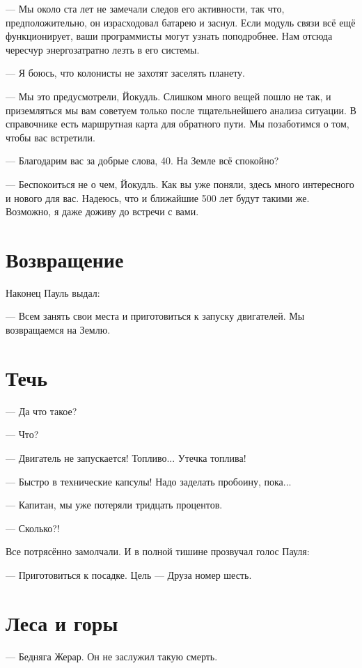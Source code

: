 \documentclass[a4paper,10pt,fleqn]{book}\usepackage{polyglossia}\setdefaultlanguage{english}\setotherlanguage{russian}\defaultfontfeatures{Ligatures=TeX,Mapping=tex-text}\usepackage{xcolor}\definecolor{lightgray}{HTML}{bbbbbb}\color{lightgray}\newcommand{\ml}[3]{\textcolor{black}{#3}}
\begin{document}
--- Мы около ста лет не замечали следов его активности, так что, предположительно, он израсходовал батарею и заснул.
Если модуль связи всё ещё функционирует, ваши программисты могут узнать поподробнее.
Нам отсюда чересчур энергозатратно лезть в его системы.

--- Я боюсь, что колонисты не захотят заселять планету.

--- Мы это предусмотрели, Йокудль.
Слишком много вещей пошло не так, и приземляться мы вам советуем только после тщательнейшего анализа ситуации.
В справочнике есть маршрутная карта для обратного пути.
Мы позаботимся о том, чтобы вас встретили.

--- Благодарим вас за добрые слова, 40.
На Земле всё спокойно?

--- Беспокоиться не о чем, Йокудль.
Как вы уже поняли, здесь много интересного и нового для вас.
Надеюсь, что и ближайшие 500 лет будут такими же.
Возможно, я даже доживу до встречи с вами.

\section{Возвращение}

Наконец Пауль выдал:

--- Всем занять свои места и приготовиться к запуску двигателей.
Мы возвращаемся на Землю.

\section{Течь}

--- Да что такое?

--- Что?

--- Двигатель не запускается!
Топливо...
Утечка топлива!

--- Быстро в технические капсулы!
Надо заделать пробоину, пока...

--- Капитан, мы уже потеряли тридцать процентов.

--- Сколько?!

Все потрясённо замолчали.
И в полной тишине прозвучал голос Пауля:

--- Приготовиться к посадке.
Цель --- Друза номер шесть.

\section{Леса и горы}

--- Бедняга Жерар.
Он не заслужил такую смерть.
\end{document}
